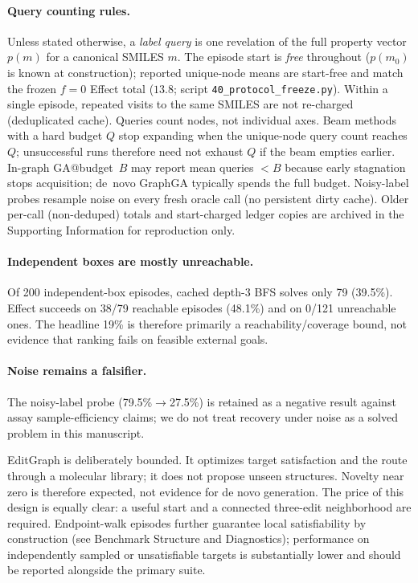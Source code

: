 \documentclass[journal=jcisd8,manuscript=article,email=false]{achemso}
\begin{document}
\paragraph{Query counting rules.}
Unless stated otherwise, a \emph{label query} is one revelation of the full property vector $p(m)$ for a canonical SMILES $m$. The episode start is \emph{free} throughout ($p(m_0)$ is known at construction); reported unique-node means are start-free and match the frozen $f{=}0$ Effect total ($13.8$; script \texttt{40\_protocol\_freeze.py}). Within a single episode, repeated visits to the same SMILES are not re-charged (deduplicated cache). Queries count nodes, not individual axes. Beam methods with a hard budget $Q$ stop expanding when the unique-node query count reaches $Q$; unsuccessful runs therefore need not exhaust $Q$ if the beam empties earlier. In-graph GA@budget~$B$ may report mean queries $<B$ because early stagnation stops acquisition; de~novo GraphGA typically spends the full budget. Noisy-label probes resample noise on every fresh oracle call (no persistent dirty cache). Older per-call (non-deduped) totals and start-charged ledger copies are archived in the Supporting Information for reproduction only.

\paragraph{Independent boxes are mostly unreachable.}
Of 200 independent-box episodes, cached depth-3 BFS solves only 79 (39.5\%). Effect succeeds on 38/79 reachable episodes (48.1\%) and on 0/121 unreachable ones. The headline 19\% is therefore primarily a reachability/coverage bound, not evidence that ranking fails on feasible external goals.

\paragraph{Noise remains a falsifier.}
The noisy-label probe (79.5\%$\to$27.5\%) is retained as a negative result against assay sample-efficiency claims; we do not treat recovery under noise as a solved problem in this manuscript.

EditGraph is deliberately bounded. It optimizes target satisfaction and the route through a molecular library; it does not propose unseen structures. Novelty near zero is therefore expected, not evidence for de novo generation. The price of this design is equally clear: a useful start and a connected three-edit neighborhood are required. Endpoint-walk episodes further guarantee local satisfiability by construction (see Benchmark Structure and Diagnostics); performance on independently sampled or unsatisfiable targets is substantially lower and should be reported alongside the primary suite.
\end{document}
